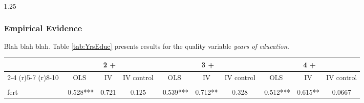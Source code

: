 \documentclass{article}[11pt,subeqn]
\begin{document}
\begin{spacing}{1.25}
\subsubsection{Empirical Evidence}
\label{scn:EE}
Blah blah blah.  Table \ref{tab:YrsEduc} presents results for the quality variable \emph{years of education}.
\begin{sidewaystable}[!htbp]
\caption{Q-Q specification with years of schooling as quality}
\vspace{-3mm}
\label{tab:YrsEduc}
\begin{center}
\begin{tabular}{lccccccccc} \toprule 
 & \multicolumn{3}{c}{2 +} &   \multicolumn{3}{c}{3 +} &  \multicolumn{3}{c}{4 +} \\  \cmidrule(r){2-4} \cmidrule(r){5-7} \cmidrule(r){8-10} 
& OLS & IV & IV control & OLS & IV & IV control & OLS & IV & IV control \\ \midrule
\begin{footnotesize}\end{footnotesize}&\begin{footnotesize}\end{footnotesize}&\begin{footnotesize}\end{footnotesize}&\begin{footnotesize}\end{footnotesize}&\begin{footnotesize}\end{footnotesize}&\begin{footnotesize}\end{footnotesize}&\begin{footnotesize}\end{footnotesize}&\begin{footnotesize}\end{footnotesize}&\begin{footnotesize}\end{footnotesize}&\begin{footnotesize}\end{footnotesize}\\
fert & -0.528*** & 0.721 & 0.125 & -0.539*** & 0.712** & 0.328 & -0.512*** & 0.615** & 0.0667 \\

\end{tabular}
\end{center}
\end{sidewaystable}
\end{spacing}
\end{document}
